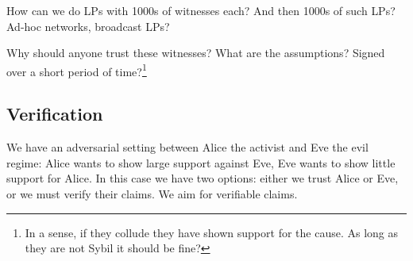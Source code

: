 \begin{frame}

  \pause

  \begin{question}
    How can we do \acp{LP} with 1000s of witnesses each?
    And then 1000s of such \acp{LP}?
    Ad-hoc networks, broadcast \acp{LP}?
  \end{question}
  \begin{question}
    Why should anyone trust these witnesses?
    What are the assumptions?
    Signed over a short period of time?\footnote{%
      In a sense, if they collude they have shown support for the cause.
      As long as they are not Sybil it should be fine?
    }
  \end{question}
\end{frame}

\subsection{Verification}
\label{Verification}

We have an adversarial setting between Alice the activist and Eve the evil 
regime: Alice wants to show large support against Eve, Eve wants to show little
support for Alice.
In this case we have two options:
either we trust Alice or Eve, or we must verify their claims.
We aim for verifiable claims.


